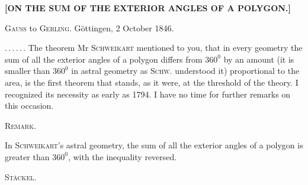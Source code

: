 \clearpage
{}%
\begin{center}
\textbf{[ON THE SUM OF THE EXTERIOR ANGLES OF A POLYGON.]}

\medskip
\textsc{Gauss} to \textsc{Gerling}. \quad Göttingen, 2 October 1846.
\end{center}

\mbox{.\,.\,.\,.\,.\,.} The theorem Mr \textsc{Schweikart} mentioned to you, that in every geometry the sum of all the exterior angles of a polygon differs from $360^0$ by an amount (it is smaller than $360^0$ in astral geometry as \textsc{Schw.} understood it) proportional to the area, is the first theorem that stands, as it were, at the threshold of the theory. I recognized its necessity as early as 1794. I have no time for further remarks on this occasion.

\begin{center}

\end{center}

\begin{center}\textsc{Remark.}\end{center}

In \textsc{Schweikart}’s astral geometry, the sum of all the exterior angles of a polygon is greater than $360^0$, with the inequality reversed.

\hfill \textsc{Stäckel}.
